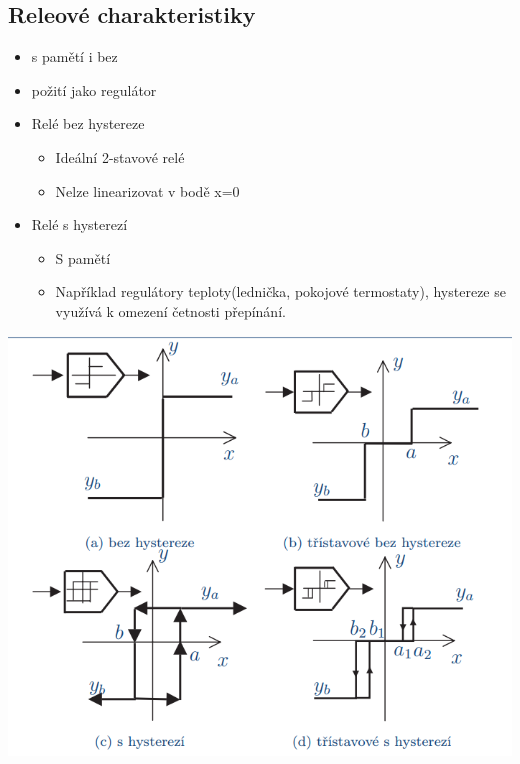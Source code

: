 \subsection*{Releové charakteristiky}
\begin{itemize}
    \item s pamětí i bez
    \item požití jako regulátor
    \item Relé bez hystereze
          \begin{itemize}
              \item Ideální 2-stavové relé
              \item Nelze linearizovat v bodě x=0
          \end{itemize}
    \item Relé s hysterezí
          \begin{itemize}
              \item S pamětí
              \item Například regulátory teploty(lednička, pokojové termostaty), hystereze se využívá k omezení četnosti přepínání.
          \end{itemize}
\end{itemize}
\includegraphics*{img/rele.png}
